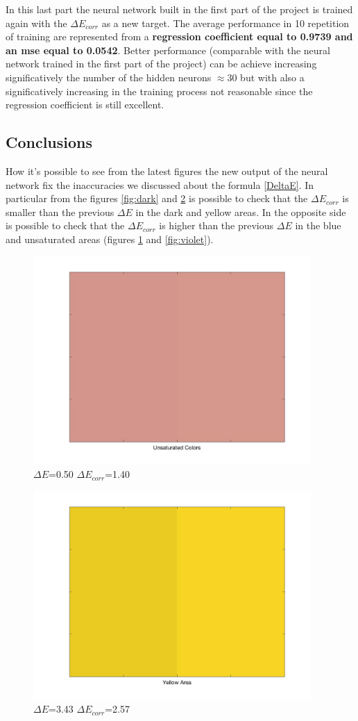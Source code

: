 \documentclass{article}
\begin{document}
In this last part the neural network built in the first part of the project is trained again with the $\Delta E_{corr}$ as a new target. The average performance in 10 repetition of training are represented from a \textbf{regression coefficient equal to 0.9739 and an mse equal to 0.0542}. Better performance (comparable with the neural network trained in the first part of the project) can be achieve increasing significatively the number of the hidden neurons $\approx{30}$ but with also a significatively increasing in the training process not reasonable since the regression coefficient is still excellent.

\subsection{Conclusions} 
How it's possible to see from the latest figures the new output of the neural network fix the inaccuracies we discussed about the formula \ref{DeltaE}. In particular from the figures \ref{fig:dark} and \ref{fig:yellow} is possible to check that the $\Delta E_{corr}$ is smaller than the previous $\Delta E$ in the dark and yellow areas. In the opposite side is possible to check that the $\Delta E_{corr}$ is higher than the previous $\Delta E$ in the blue and unsaturated areas (figures \ref{fig:unsaturated} and \ref{fig:violet}).
\begin{figure}[!h]
	\center
 	\includegraphics[width=300pt]{./img/unsaturated.jpg}
  	\caption{$\Delta E$=0.50  $\Delta E_{corr}$=1.40 }\label{fig:unsaturated}
\end{figure}
\begin{figure}[!h]
	\center
 	\includegraphics[width=300pt]{./img/yellow.jpg}
  	\caption{$\Delta E$=3.43  $\Delta E_{corr}$=2.57 }\label{fig:yellow}
\end{figure}
\end{document}
